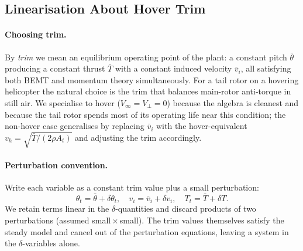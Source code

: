 \documentclass[11pt,a4paper]{article}
\newcommand{\At}{A_t}
\newcommand{\Tt}{T_t}
\newcommand{\thetat}{\theta_t}
\newcommand{\vi}{v_i}
\newcommand{\bvi}{\bar{v}_i}
\newcommand{\bT}{\bar{T}}
\newcommand{\btheta}{\bar{\theta}}
\begin{document}
\subsection{Linearisation About Hover Trim}\label{ssec:lin}

\paragraph{Choosing trim.}
By \emph{trim} we mean an equilibrium operating point of the plant: a
constant pitch \(\btheta\) producing a constant thrust \(\bT\) with a
constant induced velocity \(\bvi\), all satisfying both BEMT and
momentum theory simultaneously. For a tail rotor on a hovering
helicopter the natural choice is the trim that balances main-rotor
anti-torque in still air. We specialise to hover (\(V_\infty=V_\perp=0\))
because the algebra is cleanest and because the tail rotor spends most
of its operating life near this condition; the non-hover case
generalises by replacing \(\bvi\) with the hover-equivalent
\(v_h=\sqrt{\bT/(2\rho\At)}\) and adjusting the trim accordingly.

\paragraph{Perturbation convention.}
Write each variable as a constant trim value plus a small perturbation:
\begin{equation}
\thetat = \btheta + \delta\thetat,\quad
\vi = \bvi + \delta\vi,\quad
\Tt = \bT + \delta T.
\end{equation}
We retain terms linear in the \(\delta\)-quantities and discard products
of two perturbations (assumed small\,\(\times\)\,small). The trim values
themselves satisfy the steady model and cancel out of the perturbation
equations, leaving a system in the \(\delta\)-variables alone.
\end{document}
